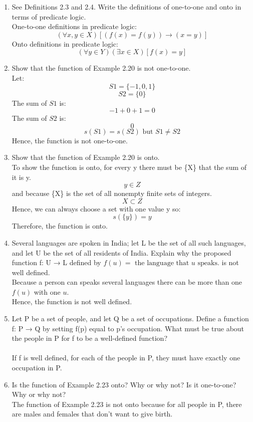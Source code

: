 \documentclass[12pt]{article}
\begin{document}
\begin{enumerate}
      \item See Definitions 2.3 and 2.4. Write the definitions of one-to-one and onto in terms of predicate logic.\\
      One-to-one definitions in predicate logic:
        \[(\forall x,y \in X)[(f(x) = f(y)) \longrightarrow (x = y)]\]
      Onto definitions in predicate logic:
        \[(\forall y \in Y)(\exists x \in X)[f(x) = y]\]
      \newpage
      \item Show that the function of Example 2.20 is not one-to-one.\\
      Let:
        \[S1 = \{-1,0,1\}\]
        \[S2 = \{0\}\]
      The sum of $S1$ is:
        \[-1 + 0 + 1 = 0\]
      The sum of $S2$ is:
        \[0\]
      \[s(S1) = s(S2) \text{ but } S1 \neq S2\]
      Hence, the function is not one-to-one.
      \item Show that the function of Example 2.20 is onto.\\
      To show the function is onto, for every y there must be \{X\} that the sum of it is y.
      \[y \in Z\]
      and because \{X\} is the set of all nonempty finite sets of integers.
      \[{X} \subset Z\] 
      Hence, we can always choose a set with one value y so:
      \[s(\{y\}) = y\]
      Therefore, the function is onto.
      \item Several languages are spoken in India; let L be the set of all such languages, and let U be the set of all residents of India. Explain why the proposed function f: U → L defined by
            $f(u) = \text{ the language that $u$ speaks.}$
      is not well defined.\\
      Because a person can speaks several languages there can be more than one $f(u)$ with one $u$.\\
      Hence, the function is not well defined.
      \item Let P be a set of people, and let Q be a set of occupations. Define a function f: P → Q by setting f(p) equal to p’s occupation. What must be true about the people in P for f to be a well-defined function?\\~\\
      If f is well defined, for each of the people in P, they must have exactly one occupation in P.
      \item Is the function of Example 2.23 onto? Why or why not? Is it one-to-one? Why or why not?\\
      The function of Example 2.23 is not onto because for all people in P, there are males and females that don't want to give birth.\\

\end{enumerate}
\end{document}
